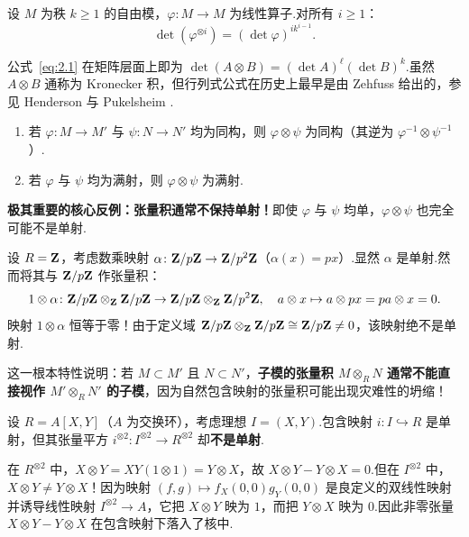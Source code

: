 \begin{corollary}\label{cor:tensor-power-det}
设 $M$ 为秩 $k \geq 1$ 的自由模，$\varphi \colon M \to M$ 为线性算子.对所有 $i \geq 1$：
\[
  \det(\varphi^{\otimes i}) = (\det \varphi)^{i k^{i-1}}.
\]
\end{corollary}

\begin{remark}\label{rem:kronecker-zehfuss}
公式~\eqref{eq:2.1} 在矩阵层面上即为 $\det(A \otimes B) = (\det A)^\ell (\det B)^k$.虽然 $A \otimes B$ 通称为 Kronecker 积，但行列式公式在历史上最早是由 Zehfuss 给出的，参见 Henderson 与 Pukelsheim \cite{henderson-pukelsheim}.
\end{remark}

\begin{theorem}[同构与满射的保持性]\label{thm:iso-surj-preserved}
\begin{enumerate}
  \item 若 $\varphi \colon M \to M'$ 与 $\psi \colon N \to N'$ 均为同构，则 $\varphi \otimes \psi$ 为同构（其逆为 $\varphi^{-1} \otimes \psi^{-1}$）.
  \item 若 $\varphi$ 与 $\psi$ 均为满射，则 $\varphi \otimes \psi$ 为满射.
\end{enumerate}
\end{theorem}

\textbf{极其重要的核心反例：张量积通常不保持单射！}即使 $\varphi$ 与 $\psi$ 均单，$\varphi \otimes \psi$ 也完全可能不是单射.

\begin{example}\label{ex:non-injective-tensor}
设 $R = \mathbf{Z}$，考虑数乘映射 $\alpha \colon \mathbf{Z}/p\mathbf{Z} \to \mathbf{Z}/p^2\mathbf{Z}$（$\alpha(x) = px$）.显然 $\alpha$ 是单射.然而将其与 $\mathbf{Z}/p\mathbf{Z}$ 作张量积：
\[
  1 \otimes \alpha \colon \mathbf{Z}/p\mathbf{Z} \otimes_{\mathbf{Z}} \mathbf{Z}/p\mathbf{Z} \to \mathbf{Z}/p\mathbf{Z} \otimes_{\mathbf{Z}} \mathbf{Z}/p^2\mathbf{Z}, \quad a \otimes x \mapsto a \otimes px = pa \otimes x = 0.
\]
映射 $1 \otimes \alpha$ 恒等于零！由于定义域 $\mathbf{Z}/p\mathbf{Z} \otimes_{\mathbf{Z}} \mathbf{Z}/p\mathbf{Z} \cong \mathbf{Z}/p\mathbf{Z} \neq 0$，该映射绝不是单射.
\end{example}

这一根本特性说明：若 $M \subset M'$ 且 $N \subset N'$，\textbf{子模的张量积 $M \otimes_R N$ 通常不能直接视作 $M' \otimes_R N'$ 的子模}，因为自然包含映射的张量积可能出现灾难性的坍缩！

\begin{example}\label{ex:tensor-square-not-injective}
设 $R = A[X, Y]$（$A$ 为交换环），考虑理想 $I = (X, Y)$.包含映射 $i \colon I \hookrightarrow R$ 是单射，但其张量平方 $i^{\otimes 2} \colon I^{\otimes 2} \to R^{\otimes 2}$ 却\textbf{不是单射}.

在 $R^{\otimes 2}$ 中，$X \otimes Y = XY(1 \otimes 1) = Y \otimes X$，故 $X \otimes Y - Y \otimes X = 0$.但在 $I^{\otimes 2}$ 中，$X \otimes Y \neq Y \otimes X$！因为映射 $(f, g) \mapsto f_X(0, 0)g_Y(0, 0)$ 是良定义的双线性映射并诱导线性映射 $I^{\otimes 2} \to A$，它把 $X \otimes Y$ 映为 $1$，而把 $Y \otimes X$ 映为 $0$.因此非零张量 $X \otimes Y - Y \otimes X$ 在包含映射下落入了核中.
\end{example}

